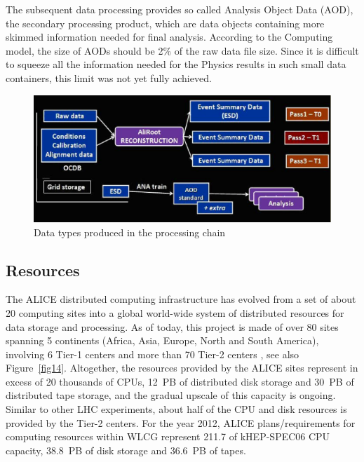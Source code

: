 The subsequent data processing provides so called Analysis Object
Data (AOD), the secondary processing product, which are data objects
containing more skimmed information needed for final analysis.
According to the Computing model, the size of AODs should be 2\% of
the raw data file size. Since it is difficult to squeeze all the
information needed for the Physics results in such small data
containers, this limit was not yet fully achieved.

\begin{figure}[htb] %
\centering
\includegraphics[width=13cm]{fig13.eps} %
\caption{Data types produced in the processing chain}\label{fig13}
\end{figure}


\subsection{Resources}
%
The ALICE distributed computing infrastructure has evolved from a
set of about 20 computing sites into a global world-wide system of
distributed resources for data storage and processing. As of today,
this project is made of over 80 sites spanning 5 continents (Africa,
Asia, Europe, North and South America), involving 6 Tier-1 centers
and more than 70 Tier-2 centers \cite{sites}, see also Figure~\ref{fig14}.
Altogether, the resources provided by the ALICE sites represent in
excess of 20 thousands of CPUs, 12~PB of distributed disk storage
and 30~PB of distributed tape storage, and the gradual upscale of
this capacity is ongoing.  Similar to other LHC experiments, about
half of the CPU and disk resources is provided by the Tier-2
centers. For the year 2012, ALICE plans/requirements for computing
resources within WLCG represent 211.7 of kHEP-SPEC06 CPU capacity,
38.8~PB of disk storage and 36.6~PB of tapes\cite{resources}.

